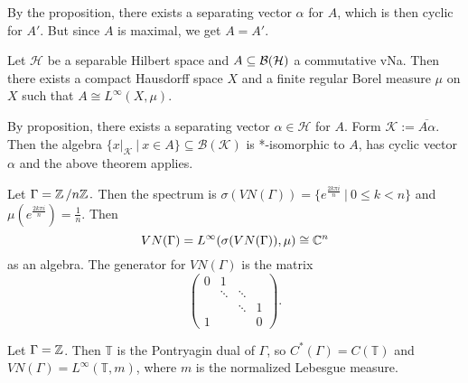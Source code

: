 \begin{myproof}
  By the proposition, there exists a separating vector $\alpha$ for $A$, which is then cyclic for 
  $A'$. But since $A$ is maximal, we get $A = A'$.
\end{myproof}

\begin{theorem}
  Let $\mathcal{H}$ be a separable Hilbert space and $A \subseteq \operatorname{\mathcal{B} (\mathcal{H})}$ a commutative 
  vNa. Then there exists a compact Hausdorff space $X$ and a finite regular Borel measure $\mu$ on $X$ such that $A \cong L^\infty (X, \mu)$.
\end{theorem}

\begin{myproof}
  By proposition, there exists a separating vector $\alpha \in \mathcal{H}$ for $A$. 
  Form $\mathcal{K} := \overline{A \alpha}$. Then the algebra $\{x\big|_{\mathcal{K}} \ |\ x \in A\} \subseteq \mathcal{B}(\mathcal{K})$
  is *-isomorphic to $A$, has cyclic vector $\alpha$ and the above theorem applies.
\end{myproof}

\begin{example}
  Let $\Gamma = \quot{\Z}{n\Z}.$ Then the spectrum is $\sigma(VN(\Gamma)) = \{e^{\frac{2k \pi i}{n}}\ |\ 0 \leq k < n\}$
  and $\mu(e^{\frac{2k\pi i}{n}}) = \frac{1}{n}$. Then $$VN(\Gamma) = L^\infty (\sigma(VN(\Gamma)), \mu) \cong \mathbb {C}^n$$
  as an algebra. The generator for $VN(\Gamma)$ is the matrix 
  $$\begin{pmatrix}
    0 & 1 &  & \\
     & \ddots & \ddots &\\
     & & \ddots & 1\\
    1 & &  &0
  \end{pmatrix}.$$
\end{example}

\begin{example}
  Let $\Gamma = \mathbb {Z}$. Then $\mathbb{T}$ is the Pontryagin dual of $\Gamma$,
  so $C^* (\Gamma) = C(\mathbb{T})$ and $VN(\Gamma) = L^\infty (\mathbb{T}, m)$, where $m$ is the normalized Lebesgue measure.
\end{example}